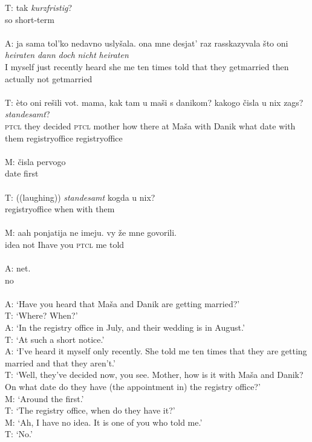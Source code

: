 \gll T: tak \textit{kurzfristig}?\\
	{}  so short-term\\
\glt \hfill \\

\gll A: ja sama tol'ko nedavno uslyšala. ona mne desjat' raz rasskazyvala \phantom{m} što oni \textit{heiraten} \textit{dann} \textit{doch} \textit{nicht} \textit{heiraten}\\
	{}  I myself just recently heard she me ten times told {} that they {get{\textunderscore}married} then actually not {get{\textunderscore}married}\\
\glt \hfill \\

\gll T: èto oni rešili vot. mama, kak tam u maši s danikom? \phantom{m} \phantom{m} kakogo čisla u nix zags? \textit{standesamt}?\\
	{} \textsc{ptcl} they decided \textsc{ptcl} mother how there at Maša with Danik {} {} what date with them {registry\textunderscore{}office} {registry\textunderscore{}office}\\
\glt \hfill \\

\gll M: čisla pervogo\\
    {} date first\\
\glt \hfill \\
    
\gll T: ((laughing)) \textit{standesamt} kogda u nix?\\
    {} {} {registry\textunderscore{}office} when with them\\
\glt \hfill \\

\gll M: aah ponjatija ne imeju. vy že mne govorili.\\
    {} {} idea not {I\textunderscore{}have} you \textsc{ptcl} me told\\
\glt \hfill \\

\gll A: net.\\
    {} no\\
\glt \hfill \\

A: `Have you heard that Maša and Danik are getting married?'\\
T: `Where? When?'\\
A: `In the registry office in July, and their wedding is in August.'\\
T: `At such a short notice.'\\
A: `I've heard it myself only recently. She told me ten times that they are \phantom{m} getting married and that they aren't.'\\
T: `Well, they've decided now, you see. Mother, how is it with Maša and \phantom{m} Danik? On what date do they have (the appointment in) the registry office?'\\
M: `Around the first.'\\
T: `The registry office, when do they have it?'\\
M: `Ah, I have no idea. It is one of you who told me.'\\
T: `No.'
\z

